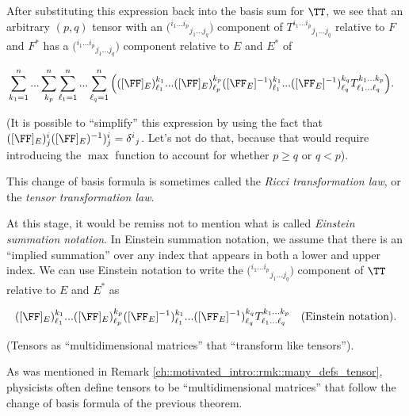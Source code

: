 \begin{theorem}
    After substituting this expression back into the basis sum for $\TT$, we see that an arbitrary $(p, q)$ tensor with an $\Big( {}^{i_1 ... i_p}{}_{j_1 ... j_q} \Big)$ component of $T^{i_1 ... i_p}{}_{j_1 ... j_q}$ relative to $F$ and $F^*$ has a $\Big( {}^{i_1 ... i_p}{}_{j_1 ... j_q} \Big)$ component relative to $E$ and $E^*$ of 
    
    \begin{align*}
        &\sum_{k_1 = 1}^n ... \sum_{k_p}^n \sum_{\ell_1 = 1}^n ... \sum_{\ell_q = 1}^n \Big( ([\FF]_E)^{k_1}_{\ell_1} ... ([\FF]_E)^{k_p}_{\ell_p}
        ([\FF_E]^{-1})^{k_1}_{\ell_1} ... ([\FF_E]^{-1})^{k_q}_{\ell_q} 
        T^{k_1 ... k_p}_{\ell_1 ... \ell_q}\Big).
    \end{align*}
    
    (It is possible to ``simplify'' this expression by using the fact that $([\FF]_E)^i_j ([\FF]_E)^{-1})^i_j = \delta^i{}_j$. Let's not do that, because that would require introducing the $\max$ function to account for whether $p \geq q$ or $q < p$).
    
    This change of basis formula is sometimes called the \textit{Ricci transformation law}, or the \textit{tensor transformation law}.
    
    At this stage, it would be remiss not to mention what is called \textit{Einstein summation notation}. In Einstein summation notation, we assume that there is an ``implied summation'' over any index that appears in both a lower and upper index. We can use Einstein notation to write the $\Big( {}^{i_1 ... i_p}{}_{j_1 ... j_q} \Big)$ component of $\TT$ relative to $E$ and $E^*$ as
    
    \begin{align*}
        ([\FF]_E)^{k_1}_{\ell_1} ... ([\FF]_E)^{k_p}_{\ell_p}
        ([\FF_E]^{-1})^{k_1}_{\ell_1} ... ([\FF_E]^{-1})^{k_q}_{\ell_q} 
        T^{k_1 ... k_p}_{\ell_1 ... \ell_q} \quad \text{(Einstein notation)}.
    \end{align*}
\end{theorem}

\begin{remark}
    (Tensors as ``multidimensional matrices'' that ``transform like tensors''). 
    
    As was mentioned in Remark \ref{ch::motivated_intro::rmk::many_defs_tensor}, physicists often define tensors to be ``multidimensional matrices'' that follow the change of basis formula of the previous theorem.
\end{remark}

